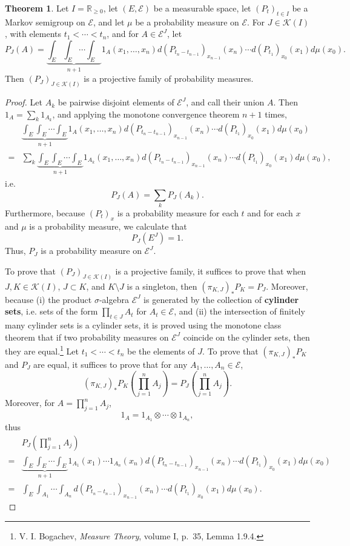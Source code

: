 \documentclass{article}
\theoremstyle{definition}
\newtheorem{theorem}{Theorem}
\theoremstyle{definition}
\begin{document}
\begin{theorem}
Let $I=\mathbb{R}_{\geq 0}$,
let $(E,\mathscr{E})$ be a measurable space, let $(P_t)_{t \in I}$ be a Markov semigroup 
on $\mathscr{E}$, and let $\mu$ be a probability measure on $\mathscr{E}$. For 
$J \in \mathscr{K}(I)$, with elements $t_1<\cdots<t_n$, and for $A \in \mathscr{E}^J$,
let
\[
P_J(A) = \underbrace{\int_E \int_E \cdots \int_E}_{n+1} 1_A(x_1,\ldots,x_n) d(P_{t_n-t_{n-1}})_{x_{n-1}}(x_n)
\cdots d(P_{t_1})_{x_0}(x_1) d\mu(x_0).
\]
Then $(P_J)_{J \in \mathscr{K}(I)}$ is a projective family of probability measures.
\label{projective}
\end{theorem}
\begin{proof}
Let $A_k$ be pairwise disjoint elements of $\mathscr{E}^J$, and call their union $A$. 
Then $1_A = \sum_k 1_{A_k}$,
and applying the monotone convergence theorem $n+1$ times,
\[
\begin{split}
& \underbrace{\int_E \int_E \cdots \int_E}_{n+1} 1_A(x_1,\ldots,x_n) d(P_{t_n-t_{n-1}})_{x_{n-1}}(x_n)
\cdots d(P_{t_1})_{x_0}(x_1) d\mu(x_0)\\
=&\sum_k  \underbrace{\int_E \int_E \cdots \int_E}_{n+1}  1_{A_k}(x_1,\ldots,x_n) d(P_{t_n-t_{n-1}})_{x_{n-1}}(x_n)
\cdots d(P_{t_1})_{x_0}(x_1) d\mu(x_0),
\end{split}
\]
i.e.
\[
P_J(A) = \sum_k P_J(A_k).
\]
Furthermore, because $(P_t)_x$ is a probability measure for each $t$ and for each $x$ and $\mu$ is a probability measure, we calculate that
\[
P_J(E^J) = 1.
\]
Thus, $P_J$ is a probability measure on $\mathscr{E}^J$. 

To prove that $(P_J)_{J \in \mathscr{K}(I)}$ is a projective family, it suffices to prove that when $J,K \in \mathscr{K}(I)$,
$J \subset K$, and $K \setminus J$ is a singleton, then $(\pi_{K,J})_* P_K = P_J$. Moreover, 
because (i) the product $\sigma$-algebra $\mathscr{E}^J$ is generated by the collection of \textbf{cylinder sets}, i.e. sets
of the form $\prod_{t \in J} A_t$ for $A_t \in \mathscr{E}$, and (ii)  the intersection of finitely many cylinder sets is a cylinder sets,
it is proved using  the monotone class theorem that if two probability measures on $\mathscr{E}^J$  coincide on the cylinder
sets, then they are equal.\footnote{V. I. Bogachev, {\em Measure Theory}, volume I, p.~35, Lemma 1.9.4.}
Let $t_1<\cdots<t_n$ be the elements of $J$. To prove that 
$(\pi_{K,J})_* P_K$ and
$P_J$ are equal, it suffices to prove that
for any $A_1,\ldots,A_n \in \mathscr{E}$,
\[
(\pi_{K,J})_* P_K\left(\prod_{j=1}^n A_j\right) = P_J\left(\prod_{j=1}^n A_j\right).
\]
Moreover, for $A=\prod_{j=1}^n A_j$,
\[
1_A = 1_{A_1} \otimes \cdots \otimes 1_{A_n}, 
\]
thus
\[
\begin{split}
&P_J\left(\prod_{j=1}^n A_j\right)\\
=& \underbrace{\int_E \int_E \cdots \int_E}_{n+1} 1_{A_1}(x_1)\cdots 1_{A_n}(x_n) d(P_{t_n-t_{n-1}})_{x_{n-1}}(x_n)
\cdots d(P_{t_1})_{x_0}(x_1) d\mu(x_0)\\
=&\int_E \int_{A_1} \cdots \int_{A_n}
d(P_{t_n-t_{n-1}})_{x_{n-1}}(x_n)
\cdots d(P_{t_1})_{x_0}(x_1) d\mu(x_0).
\end{split}
\]


\end{proof}
\end{document}
